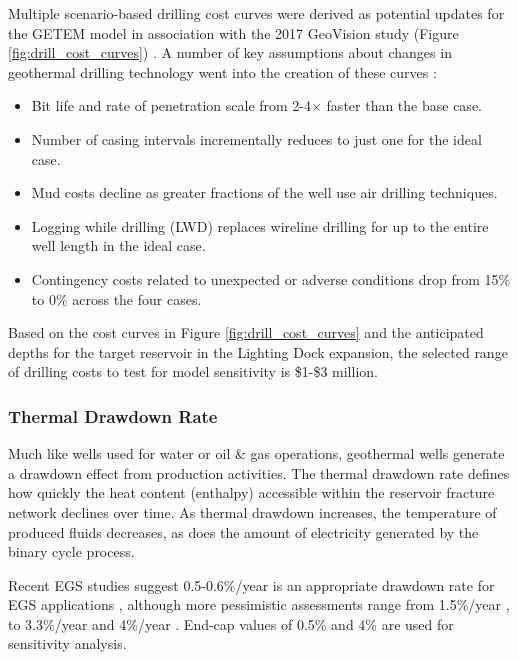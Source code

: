 Multiple scenario-based drilling cost curves were derived as potential updates for the GETEM model in association with the 2017 GeoVision study (Figure \ref{fig:drill_cost_curves}) \citep{lowry_implications_2017}. A number of key assumptions about changes in geothermal drilling technology went into the creation of these curves \citep{augustine_geovision_2019}:

\begin{itemize}[itemsep=2pt]
    \item Bit life and rate of penetration scale from 2-4$\times$ faster than the base case.
    \item Number of casing intervals incrementally reduces to just one for the ideal case.
    \item Mud costs decline as greater fractions of the well use air drilling techniques.
    \item Logging while drilling (LWD) replaces wireline drilling for up to the entire well length in the ideal case.
    \item Contingency costs related to unexpected or adverse conditions drop from 15\% to 0\% across the four cases.
    
\end{itemize}
Based on the cost curves in Figure \ref{fig:drill_cost_curves} and the anticipated depths for the target reservoir in the Lighting Dock expansion, the selected range of drilling costs to test for model sensitivity is \$1-\$3 million.

\subsubsection{Thermal Drawdown Rate}\label{ch4:drawdown_uncertainty}
Much like wells used for water or oil \& gas operations, geothermal wells generate a drawdown effect from production activities. The thermal drawdown rate defines how quickly the heat content (enthalpy) accessible within the reservoir fracture network declines over time. As thermal drawdown increases, the temperature of produced fluids decreases, as does the amount of electricity generated by the binary cycle process.

Recent EGS studies suggest 0.5-0.6\%/year is an appropriate drawdown rate for EGS applications \citep{augustine_geovision_2019}, although more pessimistic assessments range from 1.5\%/year \citep{beckers_low-temperature_2016}, to 3.3\%/year \citep{augustine_comparison_2006} and 4\%/year \citep{tester_economic_1990}. End-cap values of 0.5\% and 4\% are used for sensitivity analysis.

